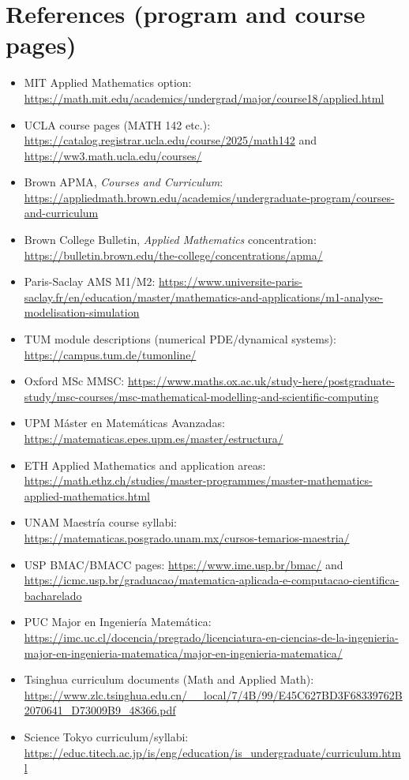 ﻿\documentclass[11pt,a4paper]{article}
\begin{document}
\section*{References (program and course pages)}
\begin{itemize}[leftmargin=*]
  \item MIT Applied Mathematics option: \url{https://math.mit.edu/academics/undergrad/major/course18/applied.html}
  \item UCLA course pages (MATH 142 etc.): \url{https://catalog.registrar.ucla.edu/course/2025/math142} and \url{https://ww3.math.ucla.edu/courses/}
  \item Brown APMA, \emph{Courses and Curriculum}: \url{https://appliedmath.brown.edu/academics/undergraduate-program/courses-and-curriculum}
  \item Brown College Bulletin, \emph{Applied Mathematics} concentration: \url{https://bulletin.brown.edu/the-college/concentrations/apma/}
  \item Paris-Saclay AMS M1/M2: \url{https://www.universite-paris-saclay.fr/en/education/master/mathematics-and-applications/m1-analyse-modelisation-simulation}
  \item TUM module descriptions (numerical PDE/dynamical systems): \url{https://campus.tum.de/tumonline/}
  \item Oxford MSc MMSC: \url{https://www.maths.ox.ac.uk/study-here/postgraduate-study/msc-courses/msc-mathematical-modelling-and-scientific-computing}
  \item UPM M\'aster en Matem\'aticas Avanzadas: \url{https://matematicas.epes.upm.es/master/estructura/}
  \item ETH Applied Mathematics and application areas: \url{https://math.ethz.ch/studies/master-programmes/master-mathematics-applied-mathematics.html}
  \item UNAM Maestr\'ia course syllabi: \url{https://matematicas.posgrado.unam.mx/cursos-temarios-maestria/}
  \item USP BMAC/BMACC pages: \url{https://www.ime.usp.br/bmac/} and \url{https://icmc.usp.br/graduacao/matematica-aplicada-e-computacao-cientifica-bacharelado}
  \item PUC Major en Ingenier\'ia Matem\'atica: \url{https://imc.uc.cl/docencia/pregrado/licenciatura-en-ciencias-de-la-ingenieria-major-en-ingenieria-matematica/major-en-ingenieria-matematica/}
  \item Tsinghua curriculum documents (Math and Applied Math): \url{https://www.zlc.tsinghua.edu.cn/__local/7/4B/99/E45C627BD3F68339762B2070641_D73009B9_48366.pdf}
  \item Science Tokyo curriculum/syllabi: \url{https://educ.titech.ac.jp/is/eng/education/is_undergraduate/curriculum.html}
\end{itemize}
\end{document}
